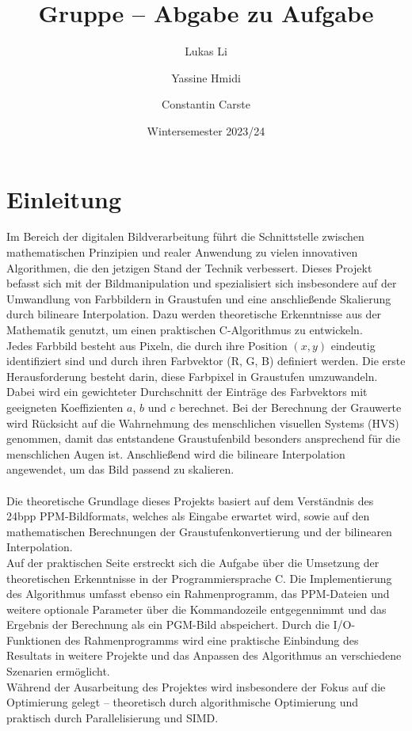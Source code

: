 \documentclass[course=erap]{aspdoc}
\author{Lukas Li \and Yassine Hmidi \and Constantin Carste}
\date{Wintersemester 2023/24} %
\title{Gruppe \theGroup{} -- Abgabe zu Aufgabe \theNumber}
\begin{document}
\maketitle

\section{Einleitung}
Im Bereich der digitalen Bildverarbeitung führt die Schnittstelle zwischen mathematischen Prinzipien und realer Anwendung zu vielen innovativen Algorithmen, die den jetzigen Stand der Technik verbessert. Dieses Projekt befasst sich mit der Bildmanipulation und spezialisiert sich insbesondere auf der Umwandlung von Farbbildern in Graustufen und eine anschließende Skalierung durch bilineare Interpolation. Dazu werden theoretische Erkenntnisse aus der Mathematik genutzt, um einen praktischen C-Algorithmus zu entwickeln.\\
Jedes Farbbild besteht aus Pixeln, die durch ihre Position $(x, y)$ eindeutig identifiziert sind und durch ihren Farbvektor (R, G, B) definiert werden. Die erste Herausforderung besteht darin, diese Farbpixel in Graustufen umzuwandeln. Dabei wird ein gewichteter Durchschnitt der Einträge des Farbvektors mit geeigneten Koeffizienten $a$, $b$ und $c$ berechnet. Bei der Berechnung der Grauwerte wird Rücksicht auf die Wahrnehmung des menschlichen visuellen Systems (HVS) genommen, damit das entstandene Graustufenbild besonders ansprechend für die menschlichen Augen ist. Anschließend wird die bilineare Interpolation angewendet, um das Bild passend zu skalieren.\\\\
Die theoretische Grundlage dieses Projekts basiert auf dem Verständnis des 24bpp PPM-Bildformats, welches als Eingabe erwartet wird, sowie auf den mathematischen Berechnungen der Graustufenkonvertierung und der bilinearen Interpolation.\\
Auf der praktischen Seite erstreckt sich die Aufgabe über die Umsetzung der theoretischen Erkenntnisse in der Programmiersprache C. Die Implementierung des Algorithmus umfasst ebenso ein Rahmenprogramm, das PPM-Dateien und weitere optionale Parameter über die Kommandozeile entgegennimmt und das Ergebnis der Berechnung als ein PGM-Bild abspeichert. Durch die I/O-Funktionen des Rahmenprogramms wird eine praktische Einbindung des Resultats in weitere Projekte und das Anpassen des Algorithmus an verschiedene Szenarien ermöglicht.\\
Während der Ausarbeitung des Projektes wird insbesondere der Fokus auf die Optimierung gelegt – theoretisch durch algorithmische Optimierung und praktisch durch Parallelisierung und SIMD.
\end{document}
